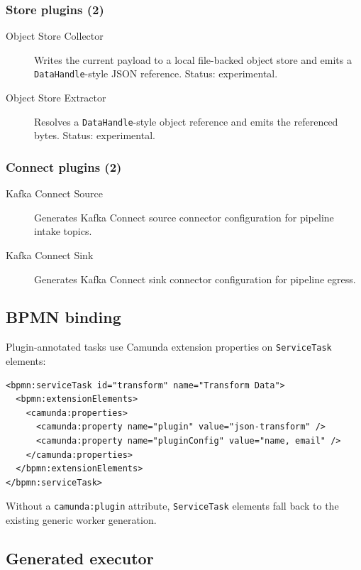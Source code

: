 \subsubsection{Store plugins (2)}

\begin{description}
\item[Object Store Collector] Writes the current payload to a local file-backed object store and emits a \texttt{DataHandle}-style JSON reference. Status: experimental.
\item[Object Store Extractor] Resolves a \texttt{DataHandle}-style object reference and emits the referenced bytes. Status: experimental.
\end{description}

\subsubsection{Connect plugins (2)}

\begin{description}
\item[Kafka Connect Source] Generates Kafka Connect source connector configuration for pipeline intake topics.
\item[Kafka Connect Sink] Generates Kafka Connect sink connector configuration for pipeline egress.
\end{description}

\subsection{BPMN binding}

Plugin-annotated tasks use Camunda extension properties on \texttt{ServiceTask}
elements:

\begin{verbatim}
<bpmn:serviceTask id="transform" name="Transform Data">
  <bpmn:extensionElements>
    <camunda:properties>
      <camunda:property name="plugin" value="json-transform" />
      <camunda:property name="pluginConfig" value="name, email" />
    </camunda:properties>
  </bpmn:extensionElements>
</bpmn:serviceTask>
\end{verbatim}

Without a \texttt{camunda:plugin} attribute, \texttt{ServiceTask} elements fall
back to the existing generic worker generation.

\subsection{Generated executor}

